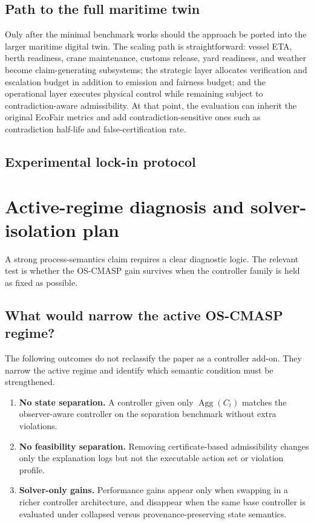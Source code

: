 \documentclass[11pt]{article}
\newcommand{\Agg}{\operatorname{Agg}}
\newcommand{\1}{\mathbf{1}}
\theoremstyle{definition}
\theoremstyle{plain}
\theoremstyle{remark}
\begin{document}
\subsection{Path to the full maritime twin}

Only after the minimal benchmark works should the approach be ported into the larger maritime digital twin. The scaling path is straightforward: vessel ETA, berth readiness, crane maintenance, customs release, yard readiness, and weather become claim-generating subsystems; the strategic layer allocates verification and escalation budget in addition to emission and fairness budget; and the operational layer executes physical control while remaining subject to contradiction-aware admissibility. At that point, the evaluation can inherit the original EcoFair metrics and add contradiction-sensitive ones such as contradiction half-life and false-certification rate.

\subsection{Experimental lock-in protocol}\label{supp:subsec:prerun-lock}

\section{Active-regime diagnosis and solver-isolation plan}
\label{supp:sec:falsification}

A strong process-semantics claim requires a clear diagnostic logic. The relevant test is whether the OS-CMASP gain survives when the controller family is held as fixed as possible.

\subsection{What would narrow the active OS-CMASP regime?}

The following outcomes do not reclassify the paper as a controller add-on. They narrow the active regime and identify which semantic condition must be strengthened.

\begin{enumerate}[leftmargin=1.7em,label=\textbf{F\arabic*:}]
\item \textbf{No state separation.} A controller given only $\Agg(C_t)$ matches the observer-aware controller on the separation benchmark without extra violations.
\item \textbf{No feasibility separation.} Removing certificate-based admissibility changes only the explanation logs but not the executable action set or violation profile.
\item \textbf{Solver-only gains.} Performance gains appear only when swapping in a richer controller architecture, and disappear when the same base controller is evaluated under collapsed versus provenance-preserving state semantics.
\end{enumerate}
\end{document}
